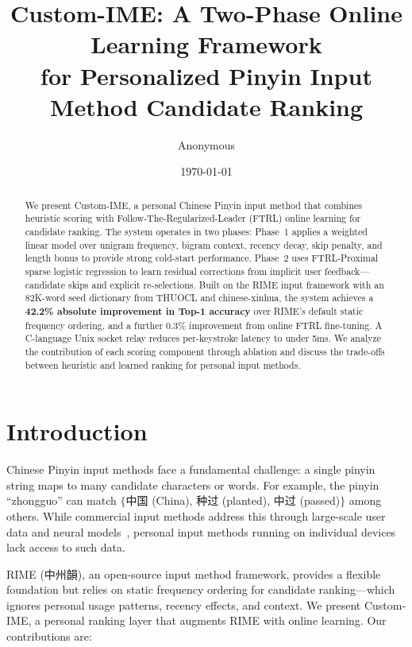 \documentclass[11pt]{article}
\title{\textbf{Custom-IME: A Two-Phase Online Learning Framework\\ for Personalized Pinyin Input Method Candidate Ranking}}
\author{Anonymous}
\date{\today}
\begin{document}
\maketitle

\begin{abstract}
We present Custom-IME, a personal Chinese Pinyin input method that combines
heuristic scoring with Follow-The-Regularized-Leader (FTRL) online learning
for candidate ranking. The system operates in two phases: Phase~1 applies a
weighted linear model over unigram frequency, bigram context, recency decay,
skip penalty, and length bonus to provide strong cold-start performance.
Phase~2 uses FTRL-Proximal sparse logistic regression to learn residual
corrections from implicit user feedback---candidate skips and explicit
re-selections. Built on the RIME input framework with an 82K-word seed
dictionary from THUOCL and chinese-xinhua, the system achieves a
\textbf{42.2\% absolute improvement in Top-1 accuracy} over RIME's default
static frequency ordering, and a further 0.3\% improvement from online FTRL
fine-tuning. A C-language Unix socket relay reduces per-keystroke latency to
under 5ms. We analyze the contribution of each scoring component through
ablation and discuss the trade-offs between heuristic and learned ranking for
personal input methods.

\end{abstract}

\section{Introduction}

Chinese Pinyin input methods face a fundamental challenge: a single pinyin
string maps to many candidate characters or words. For example, the pinyin
``zhongguo'' can match $\{$中国 (China), 种过 (planted), 中过 (passed)$\}$ among
others. While commercial input methods address this through large-scale
user data and neural models~\cite{geneinput}, personal input methods running
on individual devices lack access to such data.

RIME (中州韻), an open-source input method framework, provides a flexible
foundation but relies on static frequency ordering for candidate
ranking---which ignores personal usage patterns, recency effects, and
context. We present Custom-IME, a personal ranking layer that augments RIME
with online learning. Our contributions are:
\end{document}
